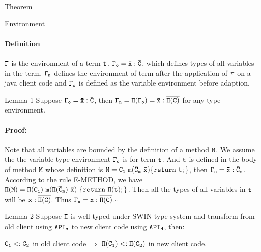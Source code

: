 \documentclass[GBK,winfonts,a4paper,11pt]{article}
\begin{document}


\begin{section}{Theorem}
\begin{subsection}{Environment}
\paragraph{Definition} $\tt\Gamma$ is the environment of a term $\tt t$. $\tt\Gamma_o=\bar{x}:\bar{C}$, which defines types of all variables in the term. $\tt\Gamma_n$ defines the environment of term after the application of $\tt \pi$ on a java client code and $\tt\Gamma_o$ is defined as the variable environment before adaption.
\end{subsection}

\begin{subsection}{Lemma 1}
Suppose $\tt\Gamma_o = \bar{x}:\bar{C}$, then $\tt\Gamma_n=\Pi(\Gamma_o)=\bar{x}:\overline{\Pi(C)}$ for any type environment.
\paragraph{Proof:}
Note that all variables are bounded by the definition of a method $\tt M$. 
We assume the the variable type environment $\tt\Gamma_o$ is for term $\tt t$. And $\tt t$ is defined in the body of method $\tt M$ whose definition is $\tt M=C_1\ m(\bar{C}_m\ \bar{x})\{return\ t;\}$, 
then $\tt\Gamma_o = \bar{x}:\bar{C}_m$. According to the rule E-METHOD, we have $\tt\Pi(M)=\Pi(C_1)\ m(\Pi(\bar{C}_m)\ \bar{x})\ \{return\ \Pi(t);\}$. Then all the types of all variables in $\tt t$ will be $\tt\bar{x}:\overline{\Pi(C)}$. Thus $\tt\Gamma_n=\bar{x}:\overline{\Pi(C)}$.\quad$\square$
\end{subsection}

\begin{subsection}{Lemma 2}
Suppose $\tt \Pi$ is well typed under SWIN type system and transform from old client using $\tt API_s$ to new client code using $\tt API_d$, then:\par
$\tt C_1<: C_2 $ in old client code $\Rightarrow$ $\tt\Pi(C_1)<:\Pi(C_2)$ in new client code.

\end{subsection}
\end{section}
\end{document}
